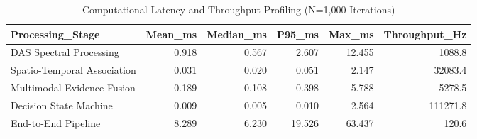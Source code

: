 \begin{table}[htbp]
\centering
\caption{Computational Latency and Throughput Profiling (N=1,000 Iterations)}
\begin{tabular}{lrrrrr}
\toprule
Processing\_Stage & Mean\_ms & Median\_ms & P95\_ms & Max\_ms & Throughput\_Hz \\
\midrule
DAS Spectral Processing & 0.918 & 0.567 & 2.607 & 12.455 & 1088.8 \\
Spatio-Temporal Association & 0.031 & 0.020 & 0.051 & 2.147 & 32083.4 \\
Multimodal Evidence Fusion & 0.189 & 0.108 & 0.398 & 5.788 & 5278.5 \\
Decision State Machine & 0.009 & 0.005 & 0.010 & 2.564 & 111271.8 \\
End-to-End Pipeline & 8.289 & 6.230 & 19.526 & 63.437 & 120.6 \\
\bottomrule
\end{tabular}
\end{table}
